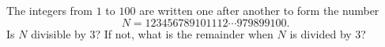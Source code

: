 The integers from $1$ to $100$ are written one after another to form the number
\[
N=123456789101112\cdots979899100 .
\]
Is $N$ divisible by $3$? If not, what is the remainder when $N$ is divided by $3$?
